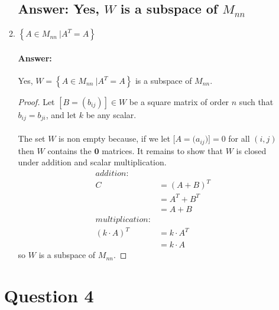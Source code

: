 \documentclass[12pt]{article}
\newcommand{\DS} [1] {${\displaystyle #1}$}
\begin{document}
\begin{enumerate}
\begin{enumerate}
                            \subsection{Answer: Yes, $W$ is a subspace of $M_{nn}$}
                      \item \DS{ \left\{A \in{M_{nn}} \ | A^T = A \right\}}
                            \paragraph{Answer:} Yes, $W={ \left\{A \in{M_{nn}} \ |
                                    A^T = A \right\}}$ is a subspace of $M_{nn}$.
                            \begin{proof}
                                    Let $[B = (b_{ij})]\in W$ be a square matrix of order $n$
                                    such that $b_{ij} = b_{ji}$, and let ${k}$ be any scalar.\\\\
                                    The set $W$ is non empty because, if we let $[A=({a_{ij})]=0}$
                                    for all $(i,j)$ then $W$ contains the $\mathbf{0}$ matrices.
                                    It remains to show that $W$ is closed under addition and scalar multiplication.
                                    \begin{align*}
                                            addition:       &                \\
                                            C               & = (A+B)^T      \\
                                                            & = A^T+B^T      \\
                                                            & = A + B        \\
                                            multiplication: &                \\
                                            (k\cdot A)^{T}  & = k\cdot A^{T} \\
                                                            & = k\cdot A
                                    \end{align*}
                                    so $W$ is a subspace of $M_{nn}$.
                            \end{proof} \pagebreak
              \end{enumerate}
              \section{Question 4}

\end{enumerate}
\end{document}
